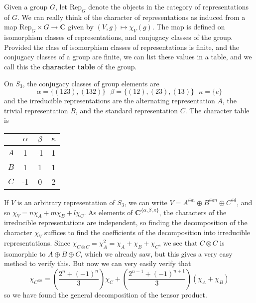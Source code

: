 Given a group $G$, let $\text{Rep}_G$ denote the objects in the category of representations of $G$. We can really think of the character of representations as induced from a map $\text{Rep}_G \times G \to \mathbf{C}$ given by $(V,g) \mapsto \chi_V(g)$. The map is defined on isomorphism classes of representations, and conjugacy classes of the group. Provided the class of isomorphism classes of representations is finite, and the conjugacy classes of a group are finite, we can list these values in a table, and we call this the {\bf character table} of the group.

\begin{example}
    On $S_3$, the conjugacy classes of group elements are
    \[ \alpha = \{ (123), (132) \}\ \ \ \beta = \{ (12), (23), (13) \}\ \ \ \kappa = \{ e \} \]
    and the irreducible representations are the alternating representation $A$, the trivial representation $B$, and the standard representation $C$. The character table is
    \begin{center}
    \begin{tabular}{ | c | c | c | c | }
    \hline
          & $\alpha$ & $\beta$ & $\kappa$\\
    \hline
        $A$ & 1     & -1 & 1\\
        $B$ & 1     &  1 & 1\\
        $C$ & -1     &  0 & 2\\
        \hline
    \end{tabular}
    \end{center}
    If $V$ is an arbitrary representation of $S_3$, we can write $V = A^{\oplus n} \oplus B^{\oplus m} \oplus C^{\oplus l}$, and so $\chi_V = n \chi_A + m \chi_B + l \chi_C$. As elements of $\mathbf{C}^{\{ \alpha, \beta, \kappa \}}$, the characters of the irreducible representations are independent, so finding the decomposition of the character $\chi_V$ suffices to find the coefficients of the decomposition into irreducible representations. Since $\chi_{C \otimes C} = \chi_A^2 = \chi_A + \chi_B + \chi_C$, we see that $C \otimes C$ is isomorphic to $A \oplus B \oplus C$, which we already saw, but this gives a very easy method to verify this. But now we can very easily verify that
    \[ \chi_{C^{\otimes n}} = \left( \frac{2^n + (-1)^n}{3} \right) \chi_C + \left( \frac{2^{n-1} + (-1)^{n+1}}{3} \right) \left( \chi_A + \chi_B \right) \]
    so we have found the general decomposition of the tensor product.
\end{example}

